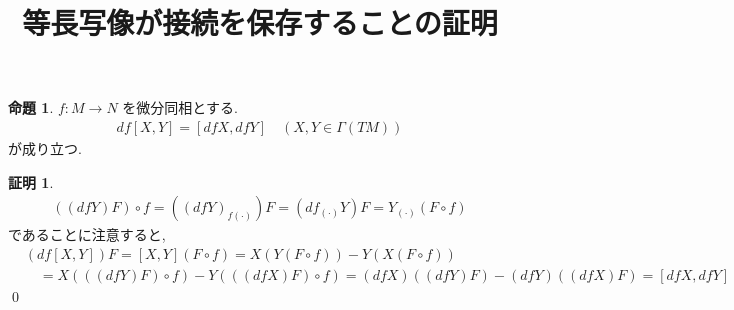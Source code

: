 \documentclass[10pt, fleqn, label-section=none]{bxjsarticle}
\title{等長写像が接続を保存することの証明}
\author{}
\date{}
\theoremstyle{definition}
\newtheorem{prop}[dfn]{命題}
\newtheorem*{pf*}{証明}
\begin{document}
\maketitle
\scriptsize 

\section{}

\begin{prop}
$f: M \rightarrow N$ を微分同相とする. 
\begin{align*} df[X,Y] = [dfX, dfY] \quad (X,Y \in \Gamma(TM))\end{align*}
が成り立つ. 
\end{prop}
\begin{pf*}
\begin{align*} ((dfY)F)\circ f = ((dfY)_{f(\cdot)})F = (df_{(\cdot)} Y) F = Y_{(\cdot)}(F\circ f) \end{align*}
であることに注意すると, 
\begin{align*} &(df[X,Y]) F = [X,Y] (F \circ f) = X (Y(F \circ f)) - Y(X(F \circ f)) \\& \quad = X(((dfY) F) \circ f) - Y (((dfX) F) \circ f) = (dfX)((dfY)F) - (dfY)((dfX)F) = [dfX, dfY] \end{align*}
\qed
\end{pf*}
\end{document}
